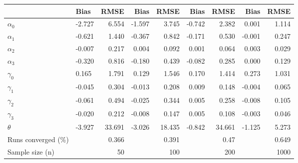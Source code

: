 
\begin{tabular}[t]{llrrrrrrr}
\toprule
  & Bias & RMSE & Bias & RMSE & Bias & RMSE & Bias & RMSE\\
\midrule
$\alpha_{0}$ & -2.727 & 6.554 & -1.597 & 3.745 & -0.742 & 2.382 & 0.001 & 1.114\\
$\alpha_{1}$ & -0.621 & 1.440 & -0.367 & 0.842 & -0.171 & 0.530 & -0.001 & 0.247\\
$\alpha_{2}$ & -0.007 & 0.217 & 0.004 & 0.092 & 0.001 & 0.064 & 0.003 & 0.029\\
$\alpha_{3}$ & -0.320 & 0.816 & -0.180 & 0.439 & -0.082 & 0.285 & 0.000 & 0.129\\
$\gamma_{0}$ & 0.165 & 1.791 & 0.129 & 1.546 & 0.170 & 1.414 & 0.273 & 1.031\\
$\gamma_{1}$ & -0.045 & 0.304 & -0.013 & 0.208 & 0.009 & 0.148 & -0.004 & 0.065\\
$\gamma_{2}$ & -0.061 & 0.494 & -0.025 & 0.344 & 0.005 & 0.258 & -0.008 & 0.105\\
$\gamma_{3}$ & -0.020 & 0.212 & -0.008 & 0.147 & 0.005 & 0.108 & -0.003 & 0.046\\
$\theta$ & -3.927 & 33.691 & -3.026 & 18.435 & -0.842 & 34.661 & -1.125 & 5.273\\
Runs converged (\%) &  & 0.366 &  & 0.391 &  & 0.47 &  & 0.649\\
Sample size (n) &  & 50 &  & 100 &  & 200 &  & 1000\\
\bottomrule
\end{tabular}
